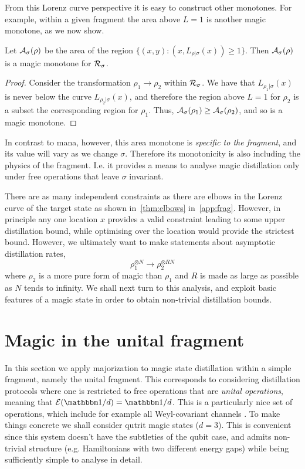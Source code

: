 \documentclass[pra,
aps,
twocolumn,
superscriptaddress,
groupedaddress,
nofootinbib,
reprint
]{revtex4-1}
\begin{document}
From this Lorenz curve perspective it is easy to construct other monotones. For example, within a given fragment the area above $L=1$ is another magic monotone, as we now show.
\begin{lemma} Let ${\mathcal A}_\sigma(\rho)$ be the area of the region $\{(x,y) : (x, L_{\rho | \sigma}(x)) \ge 1\}$. Then ${\mathcal A}_\sigma(\rho)$ is a magic monotone for $\mathcal{R}_\sigma$.
\end{lemma}
\begin{proof}
Consider the transformation $\rho_1 \rightarrow \rho_2$ within $\mathcal{R}_\sigma$. We have that $L_{\rho_1|\sigma}(x)$ is never below the curve $L_{\rho_2|\sigma}(x)$, and therefore the region above $L=1$ for $\rho_2$ is a subset the corresponding region for $\rho_1$. Thus, ${\mathcal A}_\sigma(\rho_1) \geq {\mathcal A}_\sigma(\rho_2)$, and so is a magic monotone.
\end{proof}
In contrast to mana, however, this area monotone is \emph{specific to the fragment}, and its value will vary as we change $\sigma$. Therefore its monotonicity is also including the physics of the fragment. I.e. it provides a means to analyse magic distillation only under free operations that leave $\sigma$ invariant.

There are as many independent constraints as there are elbows in the Lorenz curve of the target state as shown in~\cref{thm:elbows} in~\cref{app:frag}. However, in principle any one location $x$ provides a valid constraint leading to some upper distillation bound, while optimising over the location would provide the strictest bound. However, we ultimately want to make statements about asymptotic distillation rates,
\begin{equation}
\rho_1^{\otimes N} \longrightarrow \rho_2^{\otimes R N}
\end{equation}
where $\rho_2$ is a more pure form of magic than $\rho_1$ and $R$ is made as large as possible as $N$ tends to infinity. We shall next turn to this analysis, and exploit basic features of a magic state in order to obtain non-trivial distillation bounds.


\section{Magic in the unital fragment}

In this section we apply majorization to magic state distillation within a simple fragment, namely the unital fragment. This corresponds to considering distillation protocols where one is restricted to free operations that are \emph{unital operations}, meaning that $\E(\I/d) = \I/d$. This is a particularly nice set of operations, which include for example all Weyl-covariant channels \ddd{[CITE]}. To make things concrete we shall consider qutrit magic states ($d=3$). This is convenient since this system doesn't have the subtleties of the qubit case, and admits non-trivial structure (e.g. Hamiltonians with two different energy gaps) while being sufficiently simple to analyse in detail.
\end{document}

